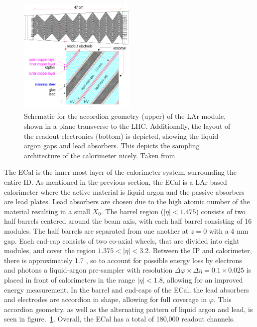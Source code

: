 \begin{figure}[htp]
    \centering
    \includegraphics[width=0.5\textwidth]{figures/atlas/atlas_larg_module_accordion.png}
    \caption{Schematic for the accordion geometry (upper) of the LAr module, shown in a plane transverse to the LHC\@. Additionally, the layout of the readout electronics (bottom) is depicted, showing the liquid argon gaps and lead absorbers. This depicts the sampling architecture of the calorimeter nicely. Taken from~\cite{atlas_calorimeter_module_accordion}}\label{fig:atlas_calorimeter_accordion}
\end{figure}

The ECal is the inner most layer of the calorimeter system, surrounding the entire ID\@. As mentioned in the previous section, the ECal is a LAr based calorimeter where the active material is liquid argon and the passive absorbers are lead plates. Lead absorbers are chosen due to the high atomic number of the material resulting in a small $X_0$. The barrel region ($|\eta| < 1.475$) consists of two half barrels centered around the beam axis, with each half barrel consisting of 16 modules. The half barrels are separated from one another at $z = 0$ with a 4 mm gap. Each end-cap consists of two co-axial wheels, that are divided into eight modules, and cover the region $1.375 < |\eta| < 3.2$. Between the IP and calorimeter, there is approximately 1.7 \radlength, so to account for possible energy loss by electrons and photons a liquid-argon pre-sampler with resolution $\Delta\varphi \times \Delta\eta = 0.1 \times 0.025$ is placed in front of calorimeters in the range $|\eta| < 1.8$, allowing for an improved energy measurement. In the barrel and end-caps of the ECal, the lead absorbers and electrodes are accordion in shape, allowing for full coverage in $\varphi$. This accordion geometry, as well as the alternating pattern of liquid argon and lead, is seen in figure.~\ref{fig:atlas_calorimeter_accordion}. Overall, the ECal has a total of 180,000 readout channels. 

